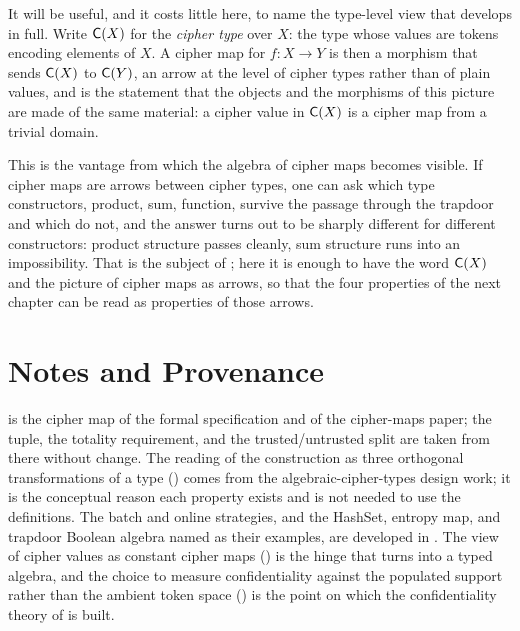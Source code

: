 It will be useful, and it costs little here, to name the type-level view
that  develops in full. Write $\mathsf{C}(X)$ for the
\emph{cipher type} over $X$: the type whose values are tokens encoding
elements of $X$. A cipher map for $f : X \to Y$ is then a morphism that
sends $\mathsf{C}(X)$ to $\mathsf{C}(Y)$, an arrow at the level of cipher types
rather than of plain values, and  is the
statement that the objects and the morphisms of this picture are made of
the same material: a cipher value in $\mathsf{C}(X)$ is a cipher map from a
trivial domain.

This is the vantage from which the algebra of cipher maps becomes visible.
If cipher maps are arrows between cipher types, one can ask which type
constructors, product, sum, function, survive the passage through the
trapdoor and which do not, and the answer turns out to be sharply
different for different constructors: product structure passes cleanly,
sum structure runs into an impossibility. That is the subject of
; here it is enough to have the word $\mathsf{C}(X)$ and
the picture of cipher maps as arrows, so that the four properties of the
next chapter can be read as properties of those arrows.

\section{Notes and Provenance}
\label{sec:ch3-notes}

 is the cipher map of the formal specification and of
the cipher-maps paper; the tuple, the totality requirement, and the
trusted/untrusted split are taken from there without change. The reading of
the construction as three orthogonal transformations of a type
() comes from the algebraic-cipher-types
design work; it is the conceptual reason each property exists and is not
needed to use the definitions. The batch and online strategies, and the
HashSet, entropy map, and trapdoor Boolean algebra named as their examples,
are developed in . The view of cipher values as
constant cipher maps () is the hinge that
 turns into a typed algebra, and the choice to measure
confidentiality against the populated support rather than the ambient token
space () is the point on which the confidentiality
theory of  is built.
